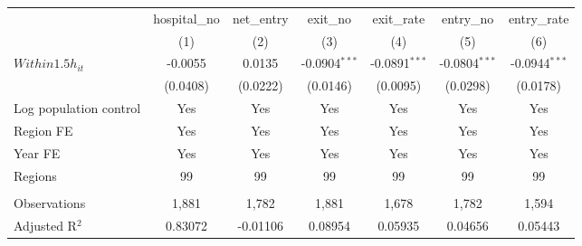 \begingroup
\centering
\begin{tabular}{lcccccc}
   \toprule
                          & hospital\_no  & net\_entry  & exit\_no        & exit\_rate      & entry\_no       & entry\_rate \\    
                          & (1)           & (2)         & (3)             & (4)             & (5)             & (6)\\  
   \midrule 
   $Within1.5h_{it}$      & -0.0055       & 0.0135      & -0.0904$^{***}$ & -0.0891$^{***}$ & -0.0804$^{***}$ & -0.0944$^{***}$\\   
                          & (0.0408)      & (0.0222)    & (0.0146)        & (0.0095)        & (0.0298)        & (0.0178)\\   
   Log population control & Yes           & Yes         & Yes             & Yes             & Yes             & Yes\\  
   Region FE              & Yes           & Yes         & Yes             & Yes             & Yes             & Yes\\  
   Year FE                & Yes           & Yes         & Yes             & Yes             & Yes             & Yes\\  
   Regions                & 99            & 99          & 99              & 99              & 99              & 99\\  
    \\
   Observations           & 1,881         & 1,782       & 1,881           & 1,678           & 1,782           & 1,594\\  
   Adjusted R$^2$         & 0.83072       & -0.01106    & 0.08954         & 0.05935         & 0.04656         & 0.05443\\  
   \bottomrule
\end{tabular}
\par\endgroup

